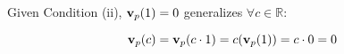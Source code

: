 \documentclass{article}
\begin{document}
\noindent
Given Condition (ii), \(\vb v_p(1) = 0\) generalizes \(\forall c \in \mathbb{R}\):

\begin{equation*}
    \vb v_p(c) = \vb v_p(c \cdot 1) = c(\vb v_p(1)) = c \cdot 0 = 0
\end{equation*}

%
%
%
%
%
%
%
%
%
%
%
%
%
\end{document}
